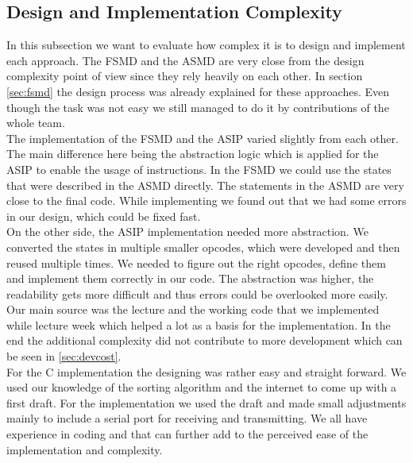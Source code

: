 \documentclass[conference]{IEEEtran}
\begin{document}
\subsection{Design and Implementation Complexity}
In this subsection we want to evaluate how complex it is to design and implement each approach. The FSMD and the ASMD are very close from the design complexity point of view since they rely heavily on each other. In section \ref{sec:fsmd} the design process was already explained for these approaches. Even though the task was not easy we still managed to do it by contributions of the whole team.\\
The implementation of the FSMD and the ASIP varied slightly from each other. The main difference here being the abstraction logic which is applied for the ASIP to enable the usage of instructions. In the FSMD we could use the states that were described in the ASMD directly. The statements in the ASMD are very close to the final code. While implementing we found out that we had some errors in our design, which could be fixed fast.\\ 
On the other side, the ASIP implementation needed more abstraction. We converted the states in multiple smaller opcodes, which were developed and then reused multiple times. We needed to figure out the right opcodes, define them and implement them correctly in our code. The abstraction was higher, the readability gets more difficult and thus errors could be overlooked more easily. Our main source was the lecture and the working code that we implemented while lecture week which helped a lot as a basis for the implementation. In the end the additional complexity did not contribute to more development which can be seen in \ref{sec:devcost}.\\
For the C implementation the designing was rather easy and straight forward. We used our knowledge of the sorting algorithm and the internet to come up with a first draft. For the implementation we used the draft and made small adjustments mainly to include a serial port for receiving and transmitting. We all have experience in coding and that can further add to the perceived ease of the implementation and complexity. \\
\end{document}
